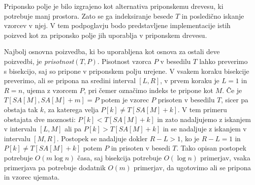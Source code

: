 Priponsko polje je bilo izgrajeno kot alternativa priponskemu drevesu, ki potrebuje manj prostora. Zato se ga indeksiranje besede $T$ in posledično iskanje vzorcev v njej. V tem podpoglavju bodo predstavljene implementacije istih poizved kot za priponsko polje jih uporablja v priponskem drevesu.

Najbolj osnovna poizvedba, ki bo uporabljena kot osnova za ostali deve poizvedbi, je \textit{prisotnost}$(T,P)$. Pisotnost vzorca $P$ v besedilu $T$ lahko preverimo s bisekcijo, saj so pripone v priponskem polju urejene. V vsakem koraku bisekcije preverimo, ali se pripona na sredini interval $[L,R]$, v prvem koraku je $L=1$ in $R=n$, ujema z vzorcem $P$, pri čemer označimo indeks te pripone kot $M$. Če je $T[SA[M],SA[M]+m]=P$ potem je vzorec $P$ prisoten v besedilu $T$, sicer pa obstaja tak $k$, za katerega velja $P[k]\ne T[SA[M]+k]$. V tem primeru obstajata dve moznosti: $P[k]<T[SA[M]+k]$ in zato nadaljujemo z iskanjem v intervalu $[L,M]$ ali pa $P[k]>T[SA[M]+k]$ in se nadaljuje z iskanjem v intervalu $[M,R]$. Postopek se nadaljuje dokler $R-L>1$, ko je $R-L=1$ in $P[k]\ne T[SA[M]+k]$ potem $P$ in prisoten v besedi $T$. Tako opisan postopek potrebuje $O(m\log{n})$ časa, saj bisekcija potrebuje $O(\log{n})$ primerjav, vsaka primerjava pa potrebuje dodatnik $O(m)$ primerjav, da ugotovimo ali se pripona in vzorec ujemata.

